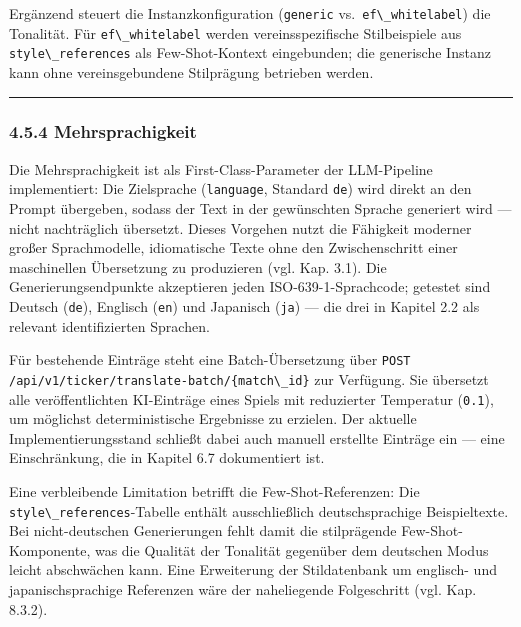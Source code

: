Ergänzend steuert die Instanzkonfiguration
(\passthrough{\lstinline!generic!}
vs.~\passthrough{\lstinline!ef\_whitelabel!}) die Tonalität. Für
\passthrough{\lstinline!ef\_whitelabel!} werden vereinsspezifische
Stilbeispiele aus \passthrough{\lstinline!style\_references!} als
Few-Shot-Kontext eingebunden; die generische Instanz kann ohne
vereinsgebundene Stilprägung betrieben werden.

\begin{center}\rule{0.5\linewidth}{0.5pt}\end{center}

\subsubsection{4.5.4 Mehrsprachigkeit}\label{mehrsprachigkeit}

Die Mehrsprachigkeit ist als First-Class-Parameter der LLM-Pipeline
implementiert: Die Zielsprache (\passthrough{\lstinline!language!},
Standard \passthrough{\lstinline!de!}) wird direkt an den Prompt
übergeben, sodass der Text in der gewünschten Sprache generiert wird ---
nicht nachträglich übersetzt. Dieses Vorgehen nutzt die Fähigkeit
moderner großer Sprachmodelle, idiomatische Texte ohne den
Zwischenschritt einer maschinellen Übersetzung zu produzieren (vgl. Kap.
3.1). Die Generierungsendpunkte akzeptieren jeden ISO-639-1-Sprachcode;
getestet sind Deutsch (\passthrough{\lstinline!de!}), Englisch
(\passthrough{\lstinline!en!}) und Japanisch
(\passthrough{\lstinline!ja!}) --- die drei in Kapitel 2.2 als relevant
identifizierten Sprachen.

Für bestehende Einträge steht eine Batch-Übersetzung über
\passthrough{\lstinline!POST /api/v1/ticker/translate-batch/\{match\_id\}!}
zur Verfügung. Sie übersetzt alle veröffentlichten KI-Einträge eines
Spiels mit reduzierter Temperatur (\passthrough{\lstinline!0.1!}), um
möglichst deterministische Ergebnisse zu erzielen. Der aktuelle
Implementierungsstand schließt dabei auch manuell erstellte Einträge ein
--- eine Einschränkung, die in Kapitel 6.7 dokumentiert ist.

Eine verbleibende Limitation betrifft die Few-Shot-Referenzen: Die
\passthrough{\lstinline!style\_references!}-Tabelle enthält
ausschließlich deutschsprachige Beispieltexte. Bei nicht-deutschen
Generierungen fehlt damit die stilprägende Few-Shot-Komponente, was die
Qualität der Tonalität gegenüber dem deutschen Modus leicht abschwächen
kann. Eine Erweiterung der Stildatenbank um englisch- und
japanischsprachige Referenzen wäre der naheliegende Folgeschritt (vgl.
Kap. 8.3.2).

